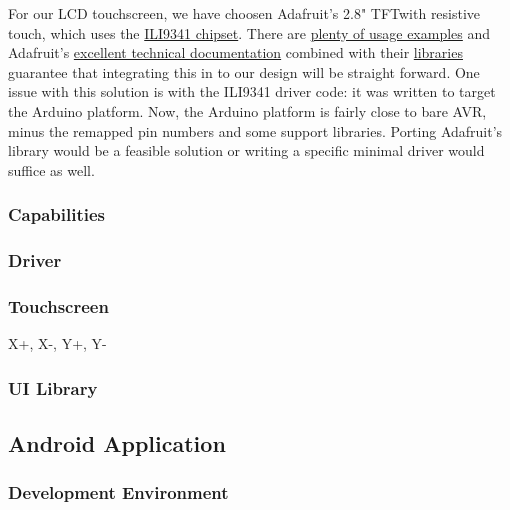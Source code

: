 For our LCD touchscreen, we have choosen Adafruit's 2.8" TFT\footnotemark with
resistive touch, which uses the \href{}{ILI9341 chipset}. There are
\href{https://github.com/adafruit/Adafruit_ILI9341/tree/master/examples}{plenty
of usage examples} and Adafruit's
\href{https://learn.adafruit.com/adafruit-2-dot-8-color-tft-touchscreen-breakout-v2}{excellent
technical documentation} combined with their
\href{https://github.com/adafruit/Adafruit_ILI9341}{libraries} guarantee that
integrating this in to our design will be straight forward. One issue with this
solution is with the ILI9341 driver code: it was written to target the Arduino
platform. Now, the Arduino platform is fairly close to bare AVR, minus the
remapped pin numbers and some support libraries. Porting Adafruit's library
would be a feasible solution or writing a specific minimal driver would suffice
as well.


\subsubsection{Capabilities}

\subsubsection{Driver}

\subsubsection{Touchscreen}

X+, X-, Y+, Y-

\subsubsection{UI Library}

\subsection{Android Application}

\subsubsection{Development Environment}

